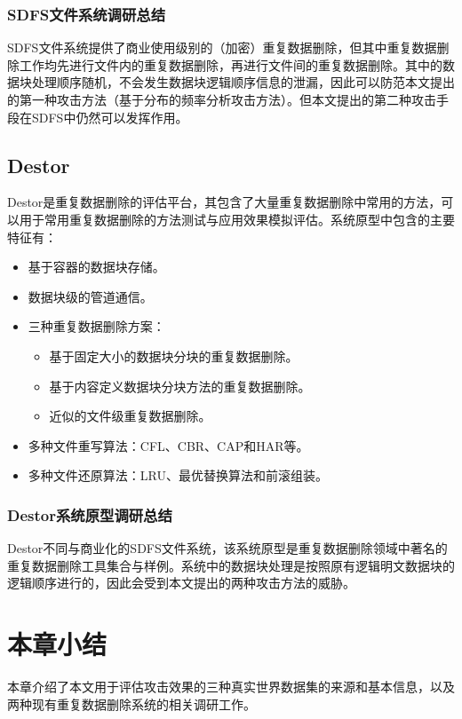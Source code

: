 \subsubsection{SDFS文件系统调研总结}

SDFS文件系统提供了商业使用级别的（加密）重复数据删除，但其中重复数据删除工作均先进行文件内的重复数据删除，再进行文件间的重复数据删除。其中的数据块处理顺序随机，不会发生数据块逻辑顺序信息的泄漏，因此可以防范本文提出的第一种攻击方法（基于分布的频率分析攻击方法）。但本文提出的第二种攻击手段在SDFS中仍然可以发挥作用。

\subsection{Destor}

Destor是重复数据删除的评估平台，其包含了大量重复数据删除中常用的方法，可以用于常用重复数据删除的方法测试与应用效果模拟评估。系统原型中包含的主要特征有：

\begin{itemize}
    \item 基于容器的数据块存储。
    \item 数据块级的管道通信。
    \item 三种重复数据删除方案：
    \begin{itemize}
        \item 基于固定大小的数据块分块的重复数据删除。
        \item 基于内容定义数据块分块方法的重复数据删除。
        \item 近似的文件级重复数据删除。
    \end{itemize}
    \item 多种文件重写算法：CFL、CBR、CAP和HAR等。
    \item 多种文件还原算法：LRU、最优替换算法和前滚组装。
\end{itemize}

\subsubsection{Destor系统原型调研总结}

Destor不同与商业化的SDFS文件系统，该系统原型是重复数据删除领域中著名的重复数据删除工具集合与样例。系统中的数据块处理是按照原有逻辑明文数据块的逻辑顺序进行的，因此会受到本文提出的两种攻击方法的威胁。

\section{本章小结}
本章介绍了本文用于评估攻击效果的三种真实世界数据集的来源和基本信息，以及两种现有重复数据删除系统的相关调研工作。
